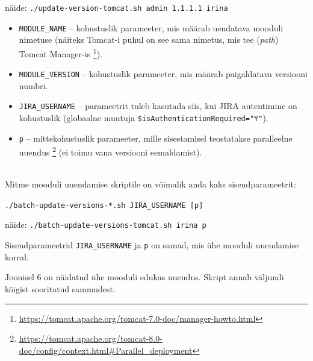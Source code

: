 \documentclass[12pt]{article}
\newcommand{\code}[1]{\texttt{#1}}
\begin{document}
  \begin{center}
    \small{näide: \code{./update-version-tomcat.sh admin 1.1.1.1 irina}}
  \end{center}
  
  \newpage

  \begin{itemize}
    \item \code{MODULE\_NAME} \--- kohustuslik parameeter, mis määrab uendatava mooduli nimetuse (näiteks Tomcat-i puhul on see sama nimetus, mis tee (\textit{path}) Tomcat Manager-is \footnote{\url{https://tomcat.apache.org/tomcat-7.0-doc/manager-howto.html}}).
    \item \code{MODULE\_VERSION} \--- kohustuslik parameeter, mis määrab paigaldatava versiooni numbri.
    \item \code{JIRA\_USERNAME} \--- parameetrit tuleb kasutada siis, kui JIRA autentimine on kohustuslik (globaalne muutuja \code{\$isAuthenticationRequired="Y"}).
    \item \code{p} \--- mittekohustuslik parameeter, mille sisestamisel teostatakse paralleelne uuendus \footnote{\url{https://tomcat.apache.org/tomcat-8.0-doc/config/context.html\#Parallel\_deployment}} (ei toimu vana versiooni eemaldamist).
  \end{itemize}\\
  
  Mitme mooduli uuendamise skriptile on võimalik anda kaks sisendparameetrit:
  
  \begin{center}
    \small{\code{./batch-update-versions-*.sh JIRA\_USERNAME [p]}}
  \end{center}
  
  \begin{center}
    \small{näide: \code{./batch-update-versions-tomcat.sh irina p}}
  \end{center}
  
    Sisendparameetrid \code{JIRA\_USERNAME} ja \code{p} on samad, mis ühe mooduli uuendamise korral.
  
  Joonisel 6 on näidatud ühe mooduli edukas uuendus. Skript annab väljundi kõigist sooritatud sammudest.
  
\end{document}
